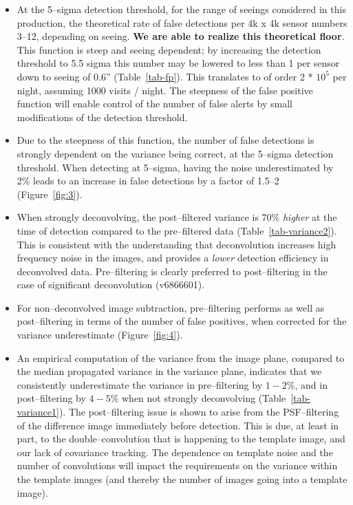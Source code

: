 \documentclass[floatfix, apj]{emulateapj}
\begin{document}
\begin{itemize}


\item At the 5--sigma detection threshold, for the range of seeings
  considered in this production, the theoretical rate of false
  detections per 4k x 4k sensor numbers 3--12, depending on seeing.
  {\bf We are able to realize this theoretical floor}.  This function
  is steep and seeing dependent; by increasing the detection threshold
  to 5.5 sigma this number may be lowered to less than 1 per sensor
  down to seeing of 0.6'' (Table~\ref{tab-fp}).  This translates to of
  order 2 * $10^5$ per night, assuming 1000 visits / night.  The
  steepness of the false positive function will enable control of the
  number of false alerts by small modifications of the detection
  threshold.

\item Due to the steepness of this function, the number of false
  detections is strongly dependent on the variance being correct, at
  the 5--sigma detection threshold.  When detecting at 5--sigma,
  having the noise underestimated by 2\% leads to an increase
  in false detections by a factor of 1.5--2 (Figure~\ref{fig:3}).

\item When strongly deconvolving, the post--filtered variance is 70\%
  {\it higher} at the time of detection compared to the pre--filtered
  data (Table~\ref{tab-variance2}).  This is consistent with the
  understanding that deconvolution increases high frequency noise in
  the images, and provides a {\it lower} detection efficiency in
  deconvolved data.  Pre--filtering is clearly preferred to post--filtering 
  in the case of significant deconvolution (v6866601).

\item For non--deconvolved image subtraction, pre--filtering performs as
  well as post--filtering in terms of the number of false positives, when 
  corrected for the variance underestimate (Figure~\ref{fig:4}).

\item An empirical computation of the variance from the image plane,
  compared to the median propagated variance in the variance plane,
  indicates that we consistently underestimate the variance in
  pre--filtering by $1-2\%$, and in post--filtering by $4-5\%$ when not
  strongly deconvolving (Table~\ref{tab-variance1}).  The post--filtering
  issue is shown to arise from the PSF--filtering of the difference
  image immediately before detection.  This is due, at least in part, to the
  double--convolution that is happening to the template image, and our
  lack of covariance tracking. The dependence on template noise and
  the number of convolutions will impact the requirements on the
  variance within the template images (and thereby the number of
  images going into a template image).


\end{itemize}
\end{document}

